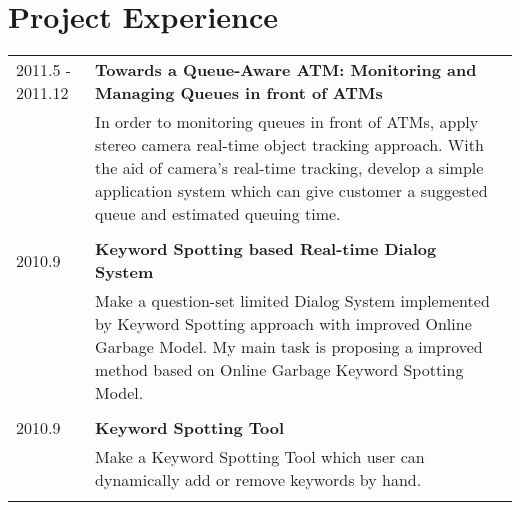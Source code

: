\documentclass[10pt]{article}
\begin{document}
\newcommand{\ExpEntryS}[5]{
\textsc{#1} & \textbf{#2} #3 \textsc{#4}\\
\nopagebreak &\multicolumn{2}{p{5.5in}}{\small{#5}}\\
\nopagebreak \multicolumn{3}{c}{} \\ [-1ex]
}

\newcommand{\ExpEntryL}[5]{
\textsc{#1} & \textbf{#2} #3 \textsc{#4}\\
\nopagebreak &\multicolumn{2}{p{5.5in}}{\small{#5}}\\
}
\vspace{0.8em}
\section{Project Experience}
\setlength\LTleft{0pt}
\setlength\LTright{0pt}
\vspace{-0.5em}
\begin{longtable}{@{\extracolsep{\fill}} l | l r}

  \ExpEntryS{2011.5 - 2011.12}%
  {Towards a Queue-Aware ATM: Monitoring and Managing Queues in front of ATMs}%
  {}%
  {}%
  {In order to monitoring queues in front of ATMs, apply stereo camera real-time object tracking approach. With the aid of camera’s real-time tracking, develop a simple application system which can give customer a suggested queue and estimated queuing time.}

  \ExpEntryS{2010.9}%
  {Keyword Spotting based Real-time Dialog System}%
  {}%
  {}%
  {Make a question-set limited Dialog System implemented by Keyword Spotting approach with improved Online Garbage Model. My main task is proposing a improved method based on Online Garbage Keyword Spotting Model.}

  \ExpEntryS{2010.9}%
  {Keyword Spotting Tool}%
  {}%
  {}%
  {Make a Keyword Spotting Tool which user can dynamically add or remove keywords by hand.}
\end{longtable}





\newcommand{\SkillEntry}[2]{ \item #2 #1 }
\vspace{-0.5em}
\end{document}
